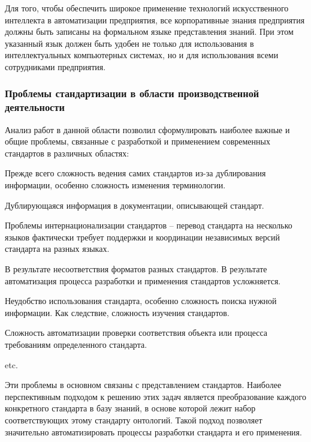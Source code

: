 Для того, чтобы обеспечить широкое применение технологий искусственного интеллекта в автоматизации предприятия, все корпоративные знания предприятия должны быть записаны на формальном языке представления знаний. При этом указанный язык должен быть удобен не только для использования в интеллектуальных компьютерных системах, но и для использования всеми сотрудниками предприятия.

\subsubsection{Проблемы стандартизации в области производственной деятельности}

Анализ работ в данной области позволил сформулировать наиболее важные и общие проблемы, связанные с разработкой и применением современных стандартов в различных областях:
\begin{textitemize}
    \item Прежде всего сложность ведения самих стандартов из-за дублирования информации, особенно сложность изменения терминологии.
    \item Дублирующаяся информация в документации, описывающей стандарт.
    \item Проблемы интернационализации стандартов -- перевод стандарта на несколько языков фактически требует поддержки и координации независимых версий стандарта на разных языках.
    \item В результате несоответствия форматов разных стандартов. В результате автоматизация процесса разработки и применения стандартов усложняется.
    \item Неудобство использования стандарта, особенно сложность поиска нужной информации. Как следствие, сложность изучения стандартов.
    \item Сложность автоматизации проверки соответствия объекта или процесса требованиям определенного стандарта.
    \item etc.
\end{textitemize}

Эти проблемы в основном связаны с представлением стандартов. Наиболее перспективным подходом к решению этих задач является преобразование каждого конкретного стандарта в базу знаний, в основе которой лежит набор соответствующих этому стандарту онтологий. Такой подход позволяет значительно автоматизировать процессы разработки стандарта и его применения.

